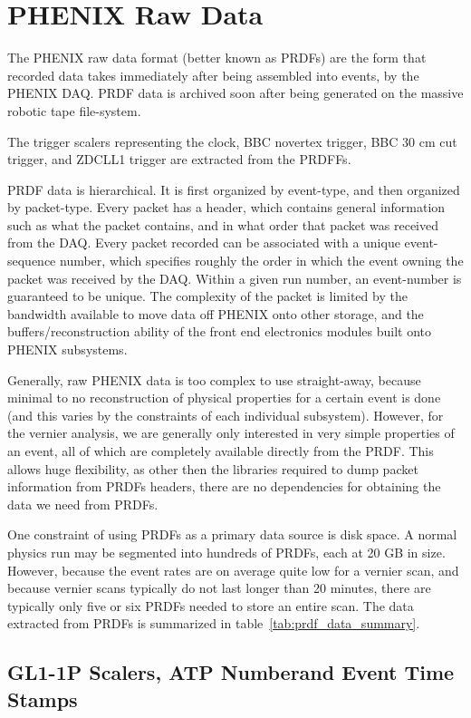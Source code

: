 \clearpage
\section{PHENIX Raw Data} 

The PHENIX raw data format (better known as PRDFs) are the form that recorded
data takes immediately after being assembled into events, by the PHENIX DAQ.
PRDF data is archived soon after being generated on the massive robotic tape
file-system. 

The trigger scalers representing the clock, BBC novertex trigger, BBC 30 cm
cut trigger, and ZDCLL1 trigger are extracted from the PRDFFs.

PRDF data is hierarchical. It is first organized by event-type, and then
organized by packet-type.  Every packet has a header, which contains general
information such as what the packet contains, and in what order that packet was
received from the DAQ. Every packet recorded can be associated with a unique
event-sequence number, which specifies roughly the order in which the event
owning the packet was received by the DAQ. Within a given run number, an
event-number is guaranteed to be unique. The complexity of the packet is limited
by the bandwidth available to move data off PHENIX onto other storage, and the
buffers/reconstruction ability of the front end electronics modules built onto
PHENIX subsystems.

Generally, raw PHENIX data is too complex to use straight-away, because minimal
to no reconstruction of physical properties for a certain event is done (and
this varies by the constraints of each individual subsystem).  However, for the
vernier analysis, we are generally only interested in very simple properties of
an event, all of which are completely available directly from the PRDF. This
allows huge flexibility, as other then the libraries required to dump packet
information from PRDFs headers, there are no dependencies for obtaining the data
we need from PRDFs.

One constraint of using PRDFs as a primary data source is disk space. A normal
physics run may be segmented into hundreds of PRDFs, each at 20 GB in size.
However, because the event rates are on average quite low for a vernier scan,
and because vernier scans typically do not last longer than 20 minutes, there
are typically only five or six PRDFs needed to store an entire scan. The data
extracted from PRDFs is summarized in table~\ref{tab:prdf_data_summary}.

\subsection{GL1-1P Scalers, ATP Numberand Event Time Stamps}

